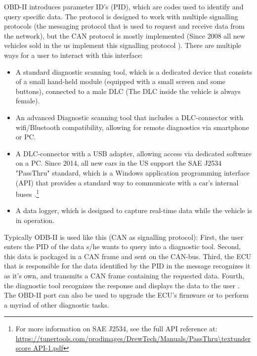 OBD-II introduces parameter ID's (PID), which are codes used to identify and query specific data. The protocol is designed to work with multiple signalling protocols (the messaging protocol that is used to request and receive data from the network), but the CAN protocol is mostly implemented (Since 2008 all new vehicles sold in the us implement this signalling protocol \cite{OBDconnector}). \newline
\newline
There are multiple ways for a user to interact with this interface:
\begin{itemize}
	\item A standard diagnostic scanning tool, which is a dedicated device that consists of a small hand-held module (equipped with a small screen and some buttons), connected to a male DLC (The DLC inside the vehicle is always female).
	
	\item An advanced Diagnostic scanning tool that includes a DLC-connector with wifi/Bluetooth compatibility, allowing for remote diagnostics via smartphone or PC.
	
	\item A DLC-connector with a USB adapter, allowing access via dedicated software on a PC. Since 2014, all new cars in the US support the SAE J2534 "PassThru" standard, which is a Windows application programming interface (API) that provides a standard way to communicate with a car's internal buses \cite{Kosher}.\footnote{For more information on SAE J2534, see the full API reference at: \url{https://tunertools.com/prodimages/DrewTech/Manuals/PassThru\textunderscore API-1.pdf}}
	
	\item A data logger, which is designed to capture real-time data while the vehicle is in operation.
\end{itemize}

Typically ODB-II is used like this (CAN as signalling protocol): First, the user enters the PID of the data s/he wants to query into a diagnostic tool. Second, this data is packaged in a CAN frame and sent on the CAN-bus. Third, the ECU that is responsible for the data identified by the PID in the message recognizes it as it's own, and transmits a CAN frame containing the requested data. Fourth, the diagnostic tool recognizes the response and displays the data to the user \cite{wiki:PID}. The OBD-II port can also be used to upgrade the ECU's firmware or to perform a myriad of other diagnostic tasks.

